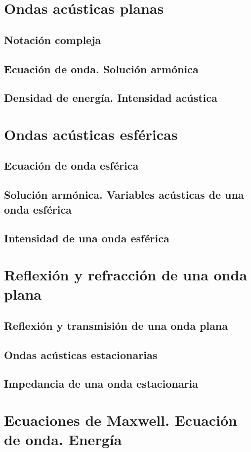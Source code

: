 \documentclass[a4paper]{book}
\begin{document}
\chapter{Ondas acústicas planas}
\section{Notación compleja}
\section{Ecuación de onda. Solución armónica}
\section{Densidad de energía. Intensidad acústica}

\chapter{Ondas acústicas esféricas}
\section{Ecuación de onda esférica}
\section{Solución armónica. Variables acústicas de una onda esférica}
\section{Intensidad de una onda esférica}

\chapter{Reflexión y refracción de una onda plana}
\section{Reflexión y transmisión de una onda plana}
\section{Ondas acústicas estacionarias}
\section{Impedancia de una onda estacionaria}

\chapter{Ecuaciones de Maxwell. Ecuación de onda. Energía}
\end{document}
